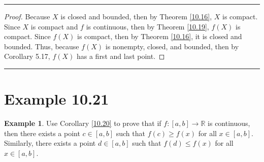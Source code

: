 \documentclass[openany, amssymb, psamsfonts]{amsart}
\newcommand{\bbR}{\mathbb{R}}
\newcommand{\arr}{\longrightarrow}
\theoremstyle{definition}
\newtheorem{exmp}{Example}[section]
\numberwithin{equation}{section}
\begin{document}
\vspace{4pt}     \hrule   \vspace{4pt}  \begin{proof}
Because $X$ is closed and bounded, then by Theorem \ref{10.16}, $X$ is compact. Since $X$ is compact and $f$ is continuous, then by Theorem \ref{10.19}, $f(X)$ is compact. Since $f(X)$ is compact, then by Theorem \ref{10.16}, it is closed and bounded. Thus, because $f(X)$ is nonempty, closed, and bounded, then by Corollary 5.17, $f(X)$ has a first and last point.
\end{proof}\vspace{4pt}     \hrule   \vspace{4pt}

\section*{Example 10.21}
\begin{exmp}  Use Corollary \ref{10.20} to prove that  if $f \colon [a,b] \arr \bbR$ is continuous, then there exists a point $c \in [a, b]$ such that $f(c) \geq f(x)$ for all $x \in [a, b]$.  Similarly, there exists a point $d \in [a, b]$ such that $f(d) \leq f(x)$ for all $x \in [a, b]$.
\end{exmp}
\end{document}
